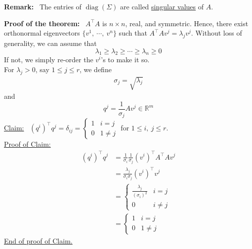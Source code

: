 \documentclass[letterpaper]{article}
\newcommand{\real}{\mathbb R}  %
\begin{document}
\noindent \textbf{Remark:}~ The entries of $\operatorname{diag}(\Sigma)$ are called \underline{singular values} of $A$.

\noindent \textbf{Proof of the theorem:}~ $A^\top A$ is $n\times n$, real, and symmetric. Hence, there exist orthonormal eigenvectors $\{v^1,\ \cdots,\ v^n\}$ such that $A^\top Av^j=\lambda_jv^j$. Without loss of generality, we can assume that
    \begin{equation*}
        \lambda_1\geq\lambda_2\geq\cdots\geq\lambda_n\geq0
    \end{equation*}
    If not, we simply re-order the $v^i$'s to make it so.\\

    For $\lambda_j>0$, say $1\leq j\leq r$, we define
    \begin{align*}
        \sigma_j=\sqrt{\lambda_j}
    \end{align*}
    and
    \begin{equation*}
        q^j = \frac{1}{\sigma_j}Av^j\in\real^m
    \end{equation*}
    \underline{Claim:}~ $\left(q^i\right)^\top q^j=\delta_{ij}=\begin{cases}
            1 & i=j\\
            0 & 1\neq j
        \end{cases}$ for $1\leq i,\ j\leq r$.\\
    \underline{Proof of Claim:}
    \begin{align*}
        \left(q^i\right)^\top q^j &= \frac{1}{\sigma_i}\frac{1}{\sigma_j}\left(v^i\right)^\top A^\top Av^j\\
        &=\frac{\lambda_j}{\sigma_i\sigma_j}\left(v^i\right)^\top v^j\\
        &= \begin{cases}
                \frac{\lambda_j}{\left(\sigma_i\right)^2} & i=j\\
                0 & i\neq j
            \end{cases}\\
        &= \begin{cases}
            1 & i=j\\
            0 & 1\neq j
        \end{cases}
    \end{align*}
    \underline{End of proof of Claim.}
\end{document}
